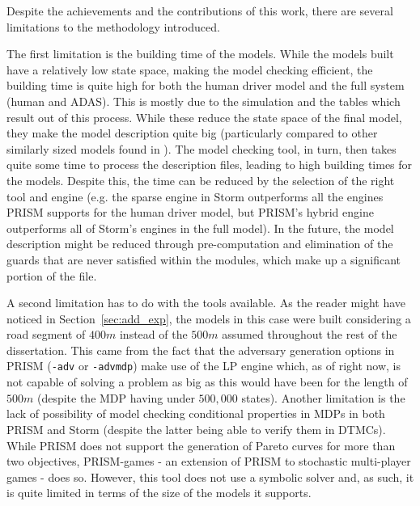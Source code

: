 Despite the achievements and the contributions of this work, there are several limitations to the methodology introduced. 

The first limitation is the building time of the models. While the models built have a relatively low state space, making the model checking efficient, the building time is quite high for both the human driver model and the full system (human and ADAS). This is mostly due to the simulation and the tables which result out of this process. While these reduce the state space of the final model, they make the model description quite big (particularly compared to other similarly sized models found in \cite{lam, games}). The model checking tool, in turn, then takes quite some time to process the description files, leading to high building times for the models. Despite this, the time can be reduced by the selection of the right tool and engine (e.g. the sparse engine in Storm outperforms all the engines PRISM supports for the human driver model, but PRISM's hybrid engine outperforms all of Storm's engines in the full model). In the future, the model description might be reduced through pre-computation and elimination of the guards that are never satisfied within the modules, which make up a significant portion of the file.

A second limitation has to do with the tools available. As the reader might have noticed in Section~\ref{sec:add_exp}, the models in this case were built considering a road segment of $400m$ instead of the $500m$ assumed throughout the rest of the dissertation. This came from the fact that the adversary generation options in PRISM (\texttt{-adv} or \texttt{-advmdp}) make use of the LP engine which, as of right now, is not capable of solving a problem as big as this would have been for the length of $500m$ (despite the MDP having under $500,000$ states). Another limitation is the lack of possibility of model checking conditional properties in MDPs in both PRISM and Storm (despite the latter being able to verify them in DTMCs). While PRISM does not support the generation of Pareto curves for more than two objectives, PRISM-games - an extension of PRISM to stochastic multi-player games \cite{prism_games} - does so. However, this tool does not use a symbolic solver and, as such, it is quite limited in terms of the size of the models it supports. 

